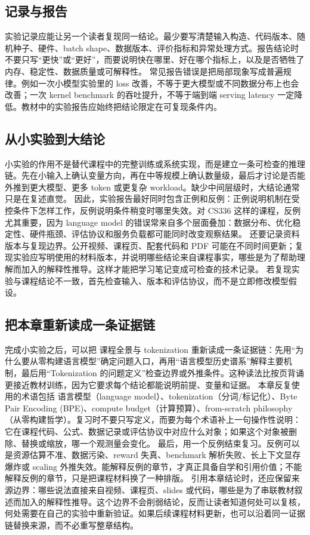 \documentclass[a4paper]{article}
\begin{document}
\subsection{记录与报告}
实验记录应能让另一个读者复现同一结论。最少要写清楚输入构造、代码版本、随机种子、硬件、batch shape、数据版本、评价指标和异常处理方式。报告结论时不要只写“更快”或“更好”，而要说明快在哪里、好在哪个指标上，以及是否牺牲了内存、稳定性、数据质量或可解释性。
常见报告错误是把局部现象写成普遍规律。例如一次小模型实验里的 loss 改善，不等于更大模型或不同数据分布上也会改善；一次 kernel benchmark 的吞吐提升，不等于端到端 serving latency 一定降低。教材中的实验报告应始终把结论限定在可复现条件内。
\subsection{从小实验到大结论}
小实验的作用不是替代课程中的完整训练或系统实现，而是建立一条可检查的推理链。先在小输入上确认变量方向，再在中等规模上确认数量级，最后才讨论是否能外推到更大模型、更多 token 或更复杂 workload。缺少中间层级时，大结论通常只是在复述直觉。
因此，实验报告最好同时包含正例和反例：正例说明机制在受控条件下怎样工作，反例说明条件稍变时哪里失效。对 CS336 这样的课程，反例尤其重要，因为 language model 的错误常来自多个层面叠加：数据分布、优化稳定性、硬件瓶颈、评估协议和服务负载都可能同时改变观察结果。
还要记录资料版本与复现边界。公开视频、课程页、配套代码和 PDF 可能在不同时间更新；复现实验应写明使用的材料版本，并说明哪些结论来自课程事实，哪些是为了帮助理解而加入的解释性推导。这样才能把学习笔记变成可检查的技术记录。
若复现实验与课程结论不一致，首先检查输入、版本和评估协议，而不是立即修改模型假设。
\subsection{把本章重新读成一条证据链}
完成小实验之后，可以把 课程全景与 tokenization 重新读成一条证据链：先用“为什么要从零构建语言模型”确定问题入口，再用“语言模型历史谱系”解释主要机制，最后用“Tokenization 的问题定义”检查边界或外推条件。这种读法比按页背诵更接近教材训练，因为它要求每个结论都能说明前提、变量和证据。
本章反复使用的术语包括 语言模型（language model）、tokenization（分词/标记化）、Byte Pair Encoding (BPE)、compute budget（计算预算）、from-scratch philosophy（从零构建哲学）。复习时不要只写定义，而要为每个术语补上一句操作性说明：它在课程代码、公式、数据记录或评估协议中对应什么对象；如果这个对象被删除、替换或缩放，哪一个观测量会变化。
最后，用一个反例结束复习。反例可以是资源估算不准、数据污染、reward 失真、benchmark 解析失败、长上下文显存爆炸或 scaling 外推失效。能解释反例的章节，才真正具备自学和引用价值；不能解释反例的章节，只是把课程材料换了一种排版。
引用本章结论时，还应保留来源边界：哪些说法直接来自视频、课程页、slides 或代码，哪些是为了串联教材叙述而加入的解释性推导。这个边界不会削弱结论，反而让读者知道何处可以复核，何处需要在自己的实验中重新验证。如果后续课程材料更新，也可以沿着同一证据链替换来源，而不必重写整章结构。
\end{document}
